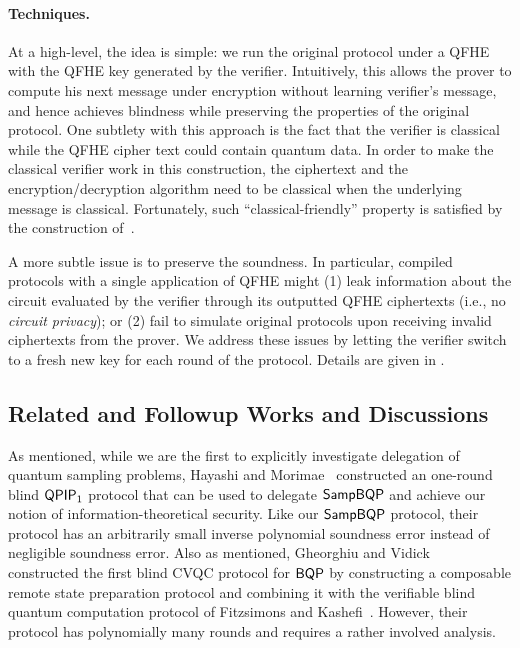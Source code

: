 \paragraph{Techniques.} At a high-level, the idea is simple: we run the original protocol under a QFHE with the QFHE key generated by the verifier. Intuitively, this allows the prover to compute his next message under encryption without learning verifier's message, and hence achieves blindness while preserving the properties of the original protocol.
One subtlety with this approach is the fact that the verifier is classical while the QFHE cipher text could contain quantum data.
In order to make the classical verifier work in this construction, the ciphertext and the encryption/decryption algorithm need to be classical when the underlying message is classical. Fortunately, such  ``classical-friendly'' property is satisfied by the construction of~\cite{mahadev_qfhe, brakerski_qfhe}.

A more subtle issue is to preserve the soundness.
In particular, compiled protocols with a single application of QFHE might (1) leak information about the circuit evaluated by the verifier through its outputted QFHE ciphertexts (i.e., no \emph{circuit privacy});
or (2) fail to simulate original protocols upon receiving invalid ciphertexts from the prover.
We address these issues by letting the verifier switch to a fresh new key for each round of the protocol. 
Details are given in .

\vspace{-3pt}

\subsection{Related and Followup Works and Discussions}  \label{subsec:discussion}

As mentioned, while we are the first to explicitly investigate delegation of quantum sampling problems, Hayashi and Morimae~\cite{hayashi2015verifiable} constructed an one-round blind $\operatorname{\mathsf{QPIP}}_1$ protocol that can be used to delegate $\operatorname{\mathsf{SampBQP}}$ and achieve our notion of information-theoretical security. Like our $\operatorname{\mathsf{SampBQP}}$ protocol, their protocol has an arbitrarily small inverse polynomial soundness error instead of negligible soundness error. Also as mentioned,  Gheorghiu and Vidick~\cite{FOCS:GheVid19} constructed the first blind CVQC protocol for $\operatorname{\mathsf{BQP}}$ by constructing a composable remote state preparation protocol and combining it with the verifiable blind quantum computation protocol of Fitzsimons and Kashefi~\cite{FK17}. However, their protocol has polynomially many rounds  and requires a rather involved analysis. 

